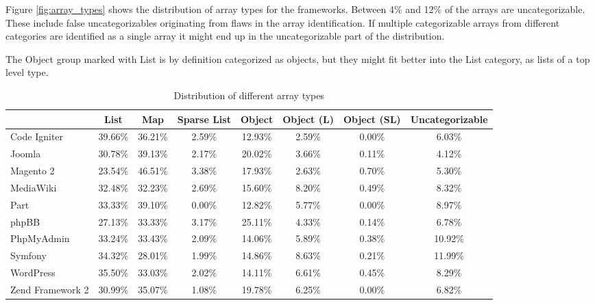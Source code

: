 Figure \ref{fig:array_types} shows the distribution of array types for the frameworks.  Between 4\% and 12\% of the arrays are uncategorizable. These include false uncategorizables originating from flaws in the array identification. If multiple categorizable arrays from different categories are identified as a single array it might end up in the uncategorizable part of the distribution.

The Object group marked with List is by definition categorized as objects, but they might fit better into the List category, as lists of a top level type. 

\begin{table}[htbp]
\begin{adjustbox}{center}
\begin{tabular}{l | c c c c c c c}
    &   List    &   Map &   Sparse List &   Object  &   Object (L)   &   Object (SL)   &   Uncategorizable \\
\hline \hline
Code Igniter    &   39.66\% &   36.21\% &   2.59\%  &   12.93\% &   2.59\%  &   0.00\%  &   6.03\% \\
Joomla          &   30.78\% &   39.13\% &	2.17\%	&   20.02\% &	3.66\%	&   0.11\%  &   4.12\% \\
Magento 2	    &   23.54\% &   46.51\% &	3.38\%	&   17.93\% &	2.63\%	&   0.70\%  &   	5.30\% \\
MediaWiki	    &   32.48\%	&   32.23\% &	2.69\%	&   15.60\% &	8.20\%	&   0.49\%  &   	8.32\% \\
Part	        &   33.33\%	&   39.10\% &	0.00\%	&   12.82\% &	5.77\%	&   0.00\%  &   	8.97\% \\
phpBB	        &   27.13\%	&   33.33\% &	3.17\%	&   25.11\% &	4.33\%	&   0.14\%  &   	6.78\% \\
PhpMyAdmin	    &   33.24\%	&   33.43\% &	2.09\%	&   14.06\% &	5.89\%	&   0.38\%  &   	10.92\% \\
Symfony	        &   34.32\%	&   28.01\% &	1.99\%	&   14.86\% &	8.63\%	&   0.21\%  &   	11.99\% \\
WordPress	    &   35.50\%	&   33.03\% &	2.02\%	&   14.11\% &	6.61\%	&   0.45\%  &   	8.29\% \\
Zend Framework 2&	30.99\%	&   35.07\% &	1.08\%	&   19.78\% &	6.25\%	&   0.00\%  &   	6.82\% 
\end{tabular}
\end{adjustbox}
\caption{Distribution of different array types}
\label{tab:array_types}
\end{table}

